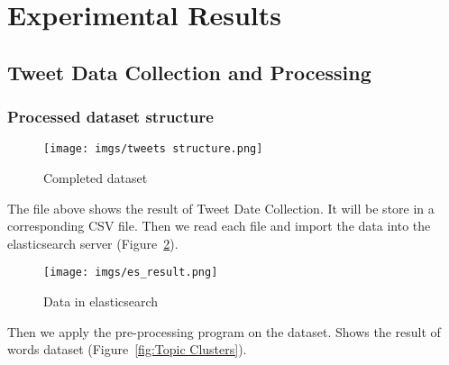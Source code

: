\section{Experimental Results}
\subsection{Tweet Data Collection and Processing}
\subsubsection{Processed dataset structure}
\begin{figure}[h]
\centering
\texttt{[image: imgs/tweets structure.png]}
\caption{\label{fig:Completed dataset}Completed dataset}
\end{figure}
The file above  shows the result of Tweet Date Collection. It will be store in
a corresponding CSV file. Then we read each file and import the data into the
elasticsearch server (Figure~\ref{fig:Data in elasticsearch}).
\begin{figure}[h]
\centering
\texttt{[image: imgs/es\_result.png]}
\caption{\label{fig:Data in elasticsearch}Data in elasticsearch}
\end{figure}
Then we apply the pre-processing program on the dataset. Shows the result of
words dataset (Figure~\ref{fig:Topic Clusters}). 

